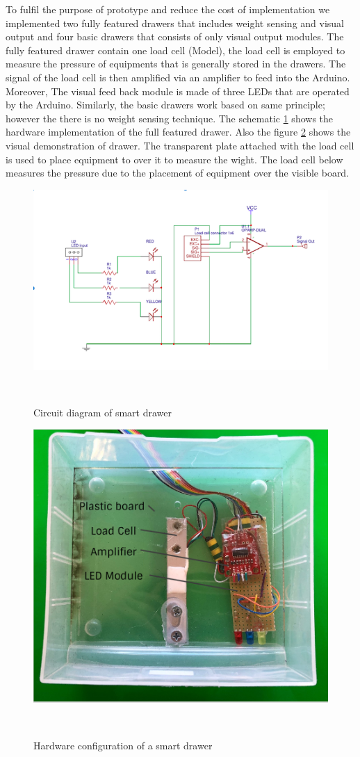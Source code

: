 To fulfil  the purpose of prototype and reduce the cost of implementation we implemented two fully featured drawers that includes weight sensing and visual output and four basic drawers that consists of only visual output modules.
The fully featured drawer contain one load cell (Model), the load cell is employed to measure the pressure of equipments that is generally stored in the drawers. 
The signal of the load cell is then amplified via an amplifier to feed into the Arduino. 
Moreover, The visual feed back module is made of three LEDs that are operated by the Arduino. Similarly, the basic drawers work based on same principle; however the there is no weight sensing technique. 
The schematic \ref{fig:example_circuit}  shows the hardware implementation of the full featured drawer. 
Also the figure \ref{fig:example_drawer} shows the visual demonstration of drawer. 
The transparent plate attached with the load cell is used to place equipment to over it to measure the wight. 
The load cell below measures the pressure due to the placement of equipment over the visible board. 
%
\begin{figure}
	\includegraphics[width=1\columnwidth]{figures/drawer_circuit}
	\caption{Circuit diagram of smart drawer}~\label{fig:example_circuit}
\end{figure}
\begin{figure}
	\includegraphics[width=1\columnwidth]{figures/drawer.png}
	\caption{Hardware configuration of a smart drawer}~\label{fig:example_drawer}
\end{figure}
%